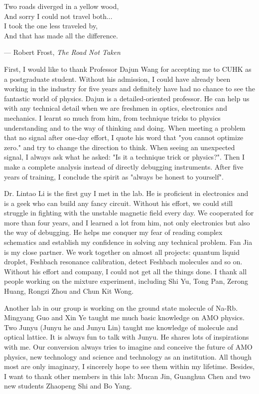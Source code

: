 \setlength{\unitlength}{1pt}
\setlength{\epigraphwidth}{9cm}
\epigraph{Two roads diverged in a yellow wood,\\And sorry I could not travel both...\\I took the one less traveled by,\\
And that has made all the difference.}{ --- Robert Frost, \textit{The Road Not Taken}}

First, I would like to thank Professor Dajun Wang for accepting me to CUHK as a postgraduate student. Without his admission, I could have already been working in the industry for five years and definitely have had no chance to see the fantastic world of physics. Dajun is a detailed-oriented professor. He can help us with any technical detail when we are freshmen in optics, electronics and mechanics. I learnt so much from him, from technique tricks to physics understanding and to the way of thinking and doing. When meeting a problem that no signal after one-day effort, I quote his word that "you cannot optimize zero." and try to change the direction to think. When seeing an unexpected signal, I always ask what he asked: "Is it a technique trick or physics?". Then I make a complete analysis instead of directly debugging instruments. After five years of training, I conclude the spirit as "always be honest to yourself".

Dr. Lintao Li is the first guy I met in the lab. He is proficient in electronics and is a geek who can build any fancy circuit. Without his effort, we could still struggle in fighting with the unstable magnetic field every day. We cooperated for more than four years, and I learned a lot from him, not only electronics but also the way of debugging. He helps me conquer my fear of reading complex schematics and establish my confidence in solving any technical problem. 
Fan Jia is my close partner. We work together on almost all projects: quantum liquid droplet, Feshbach resonance calibration, detect Feshbach molecules and so on. Without his effort and company, I could not get all the things done.
I thank all people working on the mixture experiment, including Shi Yu, Tong Pan, Zerong Huang, Rongzi Zhou and Chun Kit Wong.

Another lab in our group is working on the ground state molecule of Na-Rb. Mingyang Guo and Xin Ye taught me much basic knowledge on AMO physics. Two Junyu (Junyu he and Junyu Lin) taught me knowledge of molecule and optical lattice. It is always fun to talk with Junyu. He shares lots of inspirations with me. Our conversion always tries to imagine and conceive the future of AMO physics, new technology and science and technology as an institution. All though most are only imaginary, I sincerely hope to see them within my lifetime. Besides, I want to thank other members in this lab: Mucan Jin, Guanghua Chen and two new students Zhaopeng Shi and Bo Yang. 


